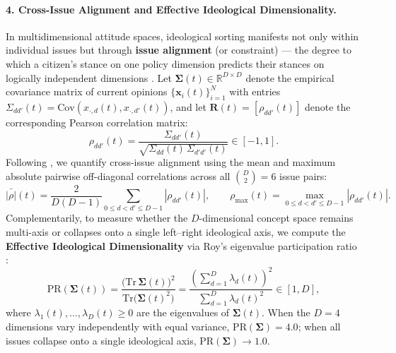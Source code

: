 \paragraph{4. Cross-Issue Alignment and Effective Ideological Dimensionality.}
In multidimensional attitude spaces, ideological sorting manifests not only within individual issues but through \textbf{issue alignment} (or constraint) — the degree to which a citizen's stance on one policy dimension predicts their stances on logically independent dimensions \citep{converse1964nature, baldassarri2008partisans}. Let $\boldsymbol{\Sigma}(t) \in \mathbb{R}^{D \times D}$ denote the empirical covariance matrix of current opinions $\{\mathbf{x}_i(t)\}_{i=1}^N$ with entries $\Sigma_{dd'}(t) = \mathrm{Cov}(x_{\cdot, d}(t), x_{\cdot, d'}(t))$, and let $\mathbf{R}(t) = [\rho_{dd'}(t)]$ denote the corresponding Pearson correlation matrix:
\begin{equation}
    \rho_{dd'}(t) = \frac{\Sigma_{dd'}(t)}{\sqrt{\Sigma_{dd}(t)\,\Sigma_{d'd'}(t)}} \in [-1, 1].
    \label{eq:pearson_issue_corr}
\end{equation}
Following \citet{baldassarri2008partisans}, we quantify cross-issue alignment using the mean and maximum absolute pairwise off-diagonal correlations across all $\binom{D}{2} = 6$ issue pairs:
\begin{equation}
    \bar{|\rho|}(t) = \frac{2}{D(D-1)} \sum_{0 \le d < d' \le D-1} |\rho_{dd'}(t)|, \qquad
    \rho_{\max}(t) = \max_{0 \le d < d' \le D-1} |\rho_{dd'}(t)|.
    \label{eq:issue_alignment_metrics}
\end{equation}
Complementarily, to measure whether the $D$-dimensional concept space remains multi-axis or collapses onto a single left--right ideological axis, we compute the \textbf{Effective Ideological Dimensionality} via Roy's eigenvalue participation ratio \citep{roy1953useful}:
\begin{equation}
    \mathrm{PR}(\boldsymbol{\Sigma}(t)) = \frac{\big(\mathrm{Tr}\,\boldsymbol{\Sigma}(t)\big)^2}{\mathrm{Tr}\!\big(\boldsymbol{\Sigma}(t)^2\big)} = \frac{\left(\sum_{d=1}^D \lambda_d(t)\right)^2}{\sum_{d=1}^D \lambda_d(t)^2} \in [1, D],
    \label{eq:participation_ratio}
\end{equation}
where $\lambda_1(t), \dots, \lambda_D(t) \ge 0$ are the eigenvalues of $\boldsymbol{\Sigma}(t)$. When the $D = 4$ dimensions vary independently with equal variance, $\mathrm{PR}(\boldsymbol{\Sigma}) = 4.0$; when all issues collapse onto a single ideological axis, $\mathrm{PR}(\boldsymbol{\Sigma}) \to 1.0$.

